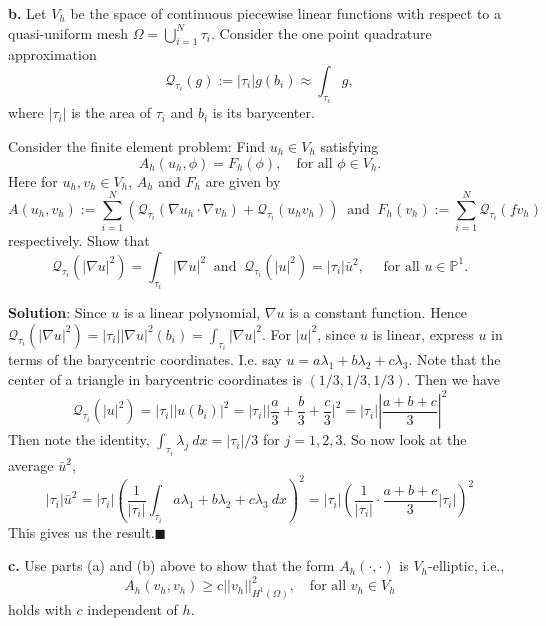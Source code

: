 \documentclass[11pt]{article}
\begin{document}
\vskip 2cm



{\bf b.} Let $V_h$ be the space of continuous piecewise linear functions with respect to a quasi-uniform mesh $\Omega = \bigcup_{i=1}^N \tau_i$. Consider the one point quadrature approximation
\[ \mathcal{Q}_{\tau_i}(g) := |\tau_i| g(b_i)\approx \int_{\tau_i} g, \]
where $|\tau_i|$ is the area of $\tau_i$ and $b_i$ is its barycenter.

Consider the finite element problem: Find $u_h \in V_h$ satisfying
\[ A_h(u_h, \phi) = F_h(\phi), \quad \text{for all } \phi \in V_h. \]
Here for $u_h, v_h \in V_h$, $A_h$ and $F_h$ are given by 
\[ A(u_h,v_h) := \sum_{i=1}^N (\mathcal{Q}_{\tau_i}(\nabla u_h \cdot \nabla v_h) + \mathcal{Q}_{\tau_i}(u_hv_h)) \: \text{ and } \: F_h(v_h) := \sum_{i=1}^N \mathcal{Q}_{\tau_i} (fv_h) \]
respectively. Show that 
\[ \mathcal{Q}_{\tau_i}(|\nabla u|^2) = \int_{\tau_i} |\nabla u|^2 \: \text{ and } \: \mathcal{Q}_{\tau_i}(|u|^2) = |\tau_i|\bar{u}^2, \quad \text{ for all } u \in \mathbb{P}^1. \]


\vskip 1cm

\textbf{Solution}: Since $u$ is a linear polynomial, $\nabla u$ is a constant function. 
Hence $\mathcal{Q}_{\tau_i}(|\nabla u|^2) = |\tau_i||\nabla u|^2(b_i) = \int_{\tau_i} |\nabla u|^2$. 
For $|u|^2$, since $u$ is linear, express $u$ in terms of the barycentric coordinates. 
I.e. say $u = a\lambda_1 + b\lambda_2 + c\lambda_3$.
Note that the center of a triangle in barycentric coordinates is $(1/3, 1/3, 1/3)$.
Then we have
\begin{equation*}
\mathcal{Q}_{\tau_i}(|u|^2) = |\tau_i||u(b_i)|^2 = |\tau_i| \Big| \frac{a}{3} + \frac{b}{3} + \frac{c}{3} \Big|^2 = |\tau_i| \left|\frac{a+b+c}{3}\right|^2 
\end{equation*}
Then note the identity, $\int_{\tau_i} \lambda_j \: dx = |\tau_i|/3$ for $j = 1,2,3$. So now look at the average $\bar{u}^2$,
\begin{equation*} 
|\tau_i|\bar{u}^2 = |\tau_i| \left(\frac{1}{|\tau_i|} \int_{\tau_i} a\lambda_1 + b\lambda_2 + c\lambda_3 \: dx \right)^2 = |\tau_i| \left(\frac{1}{|\tau_i|} \cdot \frac{a+b+c}{3}|\tau_i| \right)^2
\end{equation*}
This gives us the result.$\blacksquare$


\vskip 2cm




{\bf c.} Use parts (a) and (b) above to show that the form $A_h(\cdot, \cdot)$ is $V_h$-elliptic, i.e., 
\begin{equation}
    A_h(v_h, v_h) \geq c||v_h||^2_{H^1(\Omega)}, \quad \text{for all } v_h \in V_h
\end{equation}
holds with $c$ independent of $h$.
\end{document}
